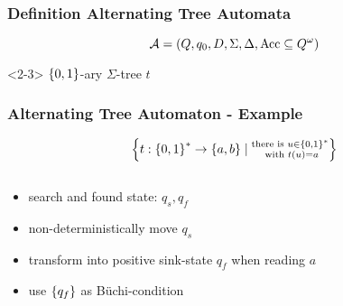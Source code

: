 \documentclass{beamer}
\begin{document}
  \begin{frame}
    \frametitle{Definition Alternating Tree Automata}
    \begin{equation*}
      \mathcal{A} = \left(Q, q_{0}, D, \Sigma, \Delta,
        \operatorname{Acc}\subseteq Q^{\omega}\right)
    \end{equation*}
    \begin{overlayarea}{\textwidth}{0.8\textheight}
      \begin{onlyenv}<2-3>
        $\left\{0,1\right\}$-ary $\Sigma$-tree $t$\hfill{}
        \begin{center}
        \end{center}
      \end{onlyenv}
    \end{overlayarea}
  \end{frame}

  \begin{frame}
    \frametitle{Alternating Tree Automaton - Example}
    \begin{equation*}
      \left\{t:\left\{0,1\right\}^{*}\rightarrow\left\{a,b\right\}\mid\substack{
        \text{there is }u\in\left\{0,1\right\}^{*}\\
        \text{ with }t(u) = a}
      \right\}
    \end{equation*}
    \begin{columns}
      \begin{column}{0.5\textwidth}
        \begin{itemize}
          \item search and found state: $q_{s}, q_{f}$
          \item<2-> non-deterministically move $q_{s}$
          \item<3-> transform into positive sink-state $q_{f}$ when reading $a$
          \item<4-> use $\left\{q_{f}\right\}$ as Büchi-condition
        \end{itemize}
      \end{column}
      \begin{column}{0.5\textwidth}
        \begin{center}
        \end{center}
      \end{column}
    \end{columns}
  \end{frame}
\end{document}
